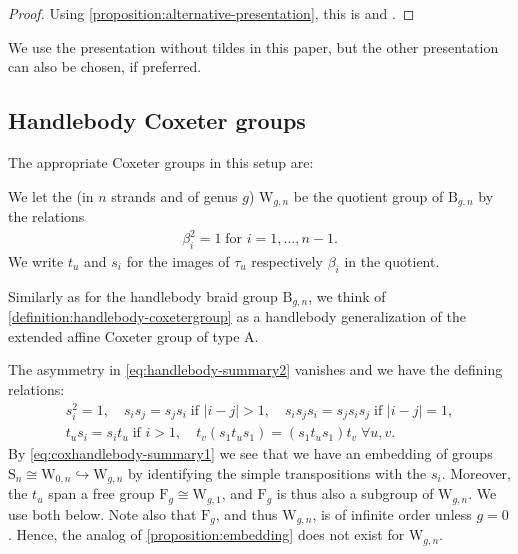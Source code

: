 \documentclass[a4paper,11pt]{amsart}
\let\emph\relax
\renewcommand{\dots}{\text{...}}
\newcommand{\setstuff}[1]{\mathrm{#1}}
\numberwithin{equation}{section}
\let\fullref\autoref
\begin{document}
\begin{proof}
Using \fullref{proposition:alternative-presentation}, this is 
\cite[Theorem 1]{Ve-handlebodies}
and \cite[Section 5]{La-handlebodies}.
\end{proof}

We use the presentation without tildes in this paper, but 
the other presentation can also be chosen, if preferred.

\subsection{Handlebody Coxeter groups}\label{subsection:coxdia}

The appropriate Coxeter groups in this setup are:

\begin{definition}\label{definition:handlebody-coxetergroup}
We let the \emph{handlebody Coxeter group} (in $n$ strands and of genus $g$)
$\setstuff{W}_{g,n}$ be the quotient group of 
$\setstuff{B}_{g,n}$ by the relations
\begin{gather*}
\beta_{i}^{2}=1
\;\text{for }i=1,\dots,n-1.
\end{gather*}
We write $t_{u}$ and $s_{i}$ for the images of 
$\tau_{u}$ respectively $\beta_{i}$ in the quotient.
\end{definition}

Similarly as for the handlebody braid group $\setstuff{B}_{g,n}$, we think of \fullref{definition:handlebody-coxetergroup} as a 
handlebody generalization of the extended affine Coxeter group of type A.

The asymmetry in \eqref{eq:handlebody-summary2} 
vanishes and we have the defining relations:
\begin{gather}\label{eq:coxhandlebody-summary1}
s_{i}^{2}=1
,\quad
s_{i}s_{j}=s_{j}s_{i}\;\text{if }|i-j|>1,
\quad
s_{i}s_{j}s_{i}=s_{j}s_{i}s_{j}\;\text{if }|i-j|=1,
\\
\label{eq:coxhandlebody-summary2}
t_{u}s_{i}
=s_{i}t_{u}\;\text{if }i>1,
\quad
t_{v}(s_{1}t_{u}s_{1})
=(s_{1}t_{u}s_{1})t_{v}
\;\forall
u,v
.
\end{gather}
By \eqref{eq:coxhandlebody-summary1}
we see that 
we have an embedding of groups $\setstuff{S}_{n}\cong\setstuff{W}_{0,n}\hookrightarrow\setstuff{W}_{g,n}$
by identifying the simple transpositions with the $s_{i}$.
Moreover, the $t_{u}$ span a free group $\setstuff{F}_{g}\cong\setstuff{W}_{g,1}$, 
and $\setstuff{F}_{g}$ is thus also a subgroup of $\setstuff{W}_{g,n}$. 
We use both below. 
Note also that $\setstuff{F}_{g}$, and thus $\setstuff{W}_{g,n}$, 
is of infinite order unless $g=0$. 
Hence, the analog of \fullref{proposition:embedding} 
does not exist for $\setstuff{W}_{g,n}$. 
\end{document}
